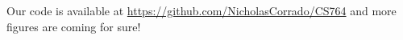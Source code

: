 \documentclass[10pt]{article}
\begin{document}
Our code is available at \url{https://github.com/NicholasCorrado/CS764} and more figures are coming for sure!










\begin{comment}
\section{Deploying lookahead filters in distributed systems}

In this section we discuss a method to deploy the LIP filters in distributed systems. This method incorporates LIP and the \textsc{hypercube} algorithm \cite{zhu2017looking,}.


Let $p$ be the number of machines available. Let $k_i$ be the primary key of $D_i$, and each tuple in the fact table $F$ possesses a foreign key to each $D_i$. Suppose $p = \prod_{1 \leq i \leq n} p_i$,  and then we label each of the $p$ machines with a coordinate $(x_1, x_2, \dots, x_n)$ where each $1 \leq x_i \leq p_i$.

We first pick $n$ hash functions $h_i$ such that the range of each $h_i$ is $\{1, 2, \dots, p_i\}$. Then for each dimension table $D_i$ and for each primary key $k_i$ in $D_i$, we send $k_i$ to all machines with $i$-th component being $h_i(k_i)$. 

\end{comment}
\end{document}
